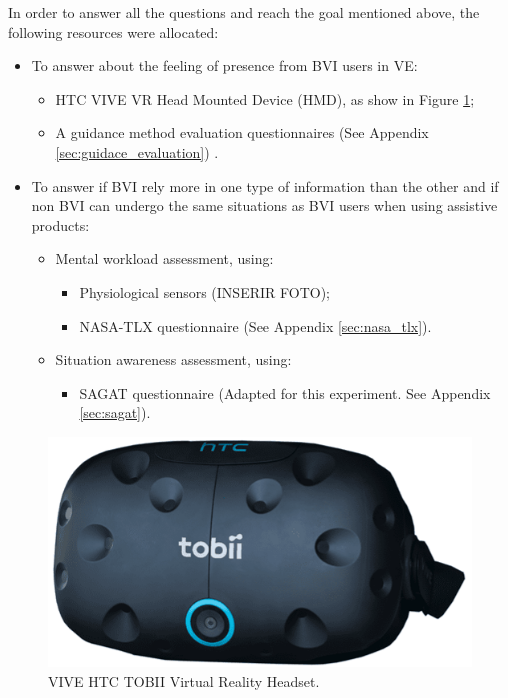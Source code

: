 In order to answer all the questions and reach the goal mentioned above, the following resources were allocated:

\begin{itemize}
    \item To answer about the feeling of presence from BVI users in VE:
    \begin{itemize}
        \item HTC VIVE VR Head Mounted Device (HMD), as show in Figure \ref{fig:htc_vive};
        \item A guidance method evaluation questionnaires (See Appendix  \ref{sec:guidace_evaluation}) .
    \end{itemize}
    \item To answer if BVI rely more in one type of information than the other and if non BVI can undergo the same situations as BVI users when using assistive products:
    \begin{itemize}
        \item Mental workload assessment, using:
            \begin{itemize}
                \item Physiological sensors (INSERIR FOTO);
                \item NASA-TLX questionnaire (See Appendix  \ref{sec:nasa_tlx}).
            \end{itemize}
            \item Situation awareness assessment, using:
            \begin{itemize}
                \item SAGAT questionnaire (Adapted for this experiment. See Appendix \ref{sec:sagat}).
            \end{itemize}
    \end{itemize}
\end{itemize}

\begin{figure}[htbp]
    \centering
    \includegraphics[width=.5\linewidth]{Introducao/VIVE.png}
    \caption{VIVE HTC TOBII Virtual Reality Headset.}
    \label{fig:htc_vive}
\end{figure}

